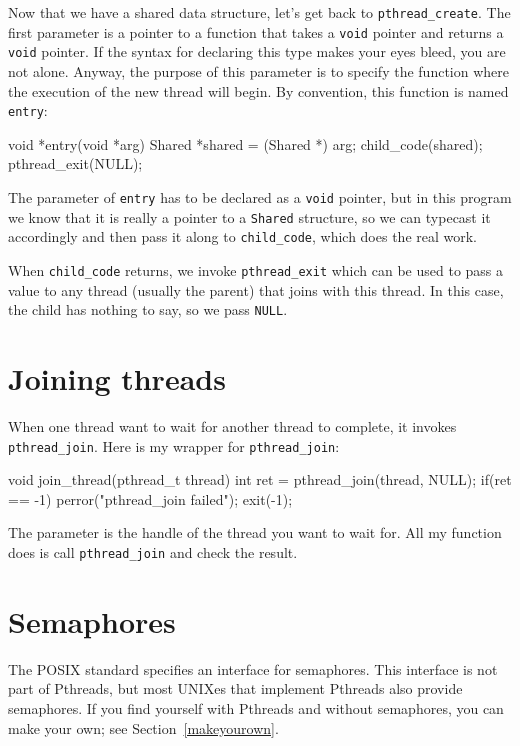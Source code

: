 \documentclass{book}
\begin{document}
Now that we have a shared data structure, let's get back to
    {\tt pthread\_create}.
The first parameter is a pointer to a function that takes
a {\tt void} pointer and returns a {\tt void} pointer.  If the syntax
for declaring this type makes your eyes bleed, you are not alone.
Anyway, the purpose of this parameter is to specify the function where
the execution of the new thread will begin.  By convention, this
function is named {\tt entry}:

\begin{unbreakable}[]{}
void *entry(void *arg) {
  Shared *shared = (Shared *) arg;
  child_code(shared);
  pthread_exit(NULL);
}
\end{unbreakable}

The parameter of {\tt entry} has to be declared as a {\tt void}
pointer, but in this program we know that it is really a pointer to a
    {\tt Shared} structure, so we can typecast it accordingly and then
pass it along to {\tt child\_code}, which does the real work.

When {\tt child\_code} returns, we invoke {\tt pthread\_exit}
which can be used to pass a value to any thread (usually the
parent) that joins with this thread.  In this case, the child
has nothing to say, so we pass {\tt NULL}.


\section{Joining threads}

When one thread want to wait for another thread to complete,
it invokes {\tt pthread\_join}.
Here is my wrapper for {\tt pthread\_join}:

\begin{unbreakable}[]{}
void join_thread(pthread_t thread) {
  int ret = pthread_join(thread, NULL);
  if(ret == -1) {
    perror("pthread_join failed");
    exit(-1);
  }
}
\end{unbreakable}

The parameter is the handle of the thread you want to wait for.
All my function does is call {\tt pthread\_join} and check the
result.


\section{Semaphores}

The POSIX standard specifies an interface for semaphores.
This interface is not part of Pthreads, but most UNIXes
that implement Pthreads also provide semaphores.  If you
find yourself with Pthreads and without semaphores, you
can make your own; see Section~\ref{makeyourown}.
\end{document}
